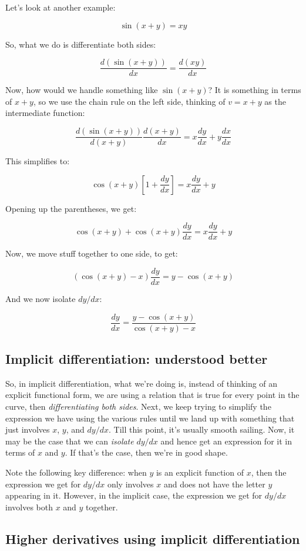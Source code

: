 \documentclass[10pt]{amsart}
\begin{document}
Let's look at another example:

$$\sin(x + y) = xy$$

So, what we do is differentiate both sides:

$$\frac{d(\sin(x + y))}{dx} = \frac{d(xy)}{dx}$$

Now, how would we handle something like $\sin(x + y)$? It is something
in terms of $x + y$, so we use the chain rule on the left side,
thinking of $v = x + y$ as the intermediate function:

$$\frac{d(\sin(x + y))}{d(x + y)} \frac{d(x + y)}{dx} = x \frac{dy}{dx} + y \frac{dx}{dx}$$

This simplifies to:

$$ \cos (x + y) \left[1 + \frac{dy}{dx}\right] = x \frac{dy}{dx} + y$$

Opening up the parentheses, we get:

$$\cos(x + y) + \cos(x + y) \frac{dy}{dx} = x \frac{dy}{dx} + y$$

Now, we move stuff together to one side, to get:

$$(\cos(x + y) - x)\frac{dy}{dx} = y - \cos(x + y)$$

And we now isolate $dy/dx$:

$$\frac{dy}{dx} = \frac{y - \cos(x + y)}{\cos(x + y) - x}$$

\subsection{Implicit differentiation: understood better}

So, in implicit differentiation, what we're doing is, instead of
thinking of an explicit functional form, we are using a relation that
is true for every point in the curve, then {\em differentiating both
sides}. Next, we keep trying to simplify the expression we have using
the various rules until we land up with something that just involves
$x$, $y$, and $dy/dx$. Till this point, it's usually smooth
sailing. Now, it may be the case that we can {\em isolate} $dy/dx$ and
hence get an expression for it in terms of $x$ and $y$. If that's the
case, then we're in good shape.

Note the following key difference: when $y$ is an explicit function of
$x$, then the expression we get for $dy/dx$ only involves $x$ and does
not have the letter $y$ appearing in it. However, in the implicit
case, the expression we get for $dy/dx$ involves both $x$ and $y$
together.

\subsection{Higher derivatives using implicit differentiation}
\end{document}
